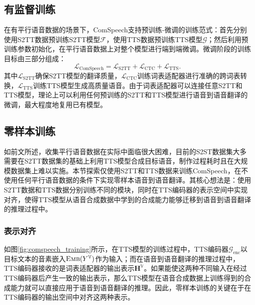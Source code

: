 \subsection{有监督训练}\label{sec:comspeech_supervised}

在有平行语音数据的场景下，ComSpeech支持预训练-微调的训练范式：首先分别使用S2TT数据预训练S2TT模型$\mathcal{F}$，使用TTS数据预训练TTS模型$\mathcal{G}$；然后利用预训练参数初始化，在平行语音数据上对整个模型进行端到端微调。微调阶段的训练目标由三部分组成：
\begin{equation}
    \mathcal{L}_{\text{ComSpeech}} = \mathcal{L}_{\text{S2TT}} + \mathcal{L}_{\text{CTC}} + \mathcal{L}_{\text{TTS}}.
\end{equation}
其中$\mathcal{L}_{\text{S2TT}}$确保S2TT模型的翻译质量，$\mathcal{L}_{\text{CTC}}$训练词表适配器进行准确的跨词表转换，$\mathcal{L}_{\text{TTS}}$训练TTS模型生成高质量语音。由于词表适配器可以连接任意S2TT和TTS模型，理论上可以利用任何预训练的S2TT和TTS模型进行语音到语音翻译的微调，最大程度地复用已有模型。


\subsection{零样本训练}\label{sec:comspeech_zeroshot}

如前文所述，收集平行语音数据在实际中面临很大困难，目前的S2ST数据集大多需要在S2TT数据集的基础上利用TTS模型合成目标语音，制作过程耗时且在大规模数据集上难以实施。本节探索仅使用S2TT和TTS数据来训练ComSpeech，在不使用任何平行语音数据的条件下实现零样本语音到语音翻译。其核心想法是：使用S2TT数据和TTS数据分别训练不同的模块，同时在TTS编码器的表示空间中实现对齐，使得TTS模型从语音合成数据中学到的合成能力能够迁移到语音到语音翻译的推理过程中。



\subsubsection{表示对齐}

如图\ref{fig:comspeech_training}所示，在TTS模型的训练过程中，TTS编码器$\mathcal{G}_{\text{enc}}$以目标文本的音素嵌入$\text{\textsc{Emb}}(Y^{\mathbb{V}})$作为输入；而在语音到语音翻译的推理过程中，TTS编码器接收的是词表适配器的输出表示$\mathbf{H}^{\mathbb{V}}$。如果能使这两种不同输入在经过TTS编码器后产生一致的输出表示，那么TTS模型在语音合成数据上训练得到的合成能力就可以直接应用于语音到语音翻译的推理。因此，零样本训练的关键在于在TTS编码器的输出空间中对齐这两种表示。

